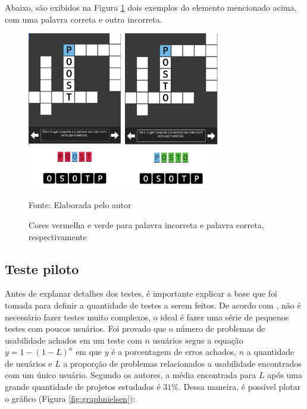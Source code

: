 Abaixo, são exibidos na Figura \ref{fig:verdevermelho} dois exemplos do elemento mencionado acima, com uma palavra correta e outra incorreta.

\begin{figure}[H]
\centering
    \caption{Cores vermelha e verde para palavra incorreta e palavra correta, respectivamente}
    \label{fig:verdevermelho}
    \includegraphics[width=0.75\textwidth]{Figuras/verdevermelho.jpg}
    
    Fonte: Elaborada pelo autor
\end{figure}


\subsection{Teste piloto}
Antes de explanar detalhes dos testes, é importante explicar a base que foi tomada para definir a quantidade de testes a serem feitos. De acordo com \cite{nielsenUsabilityMath}, não é necessário fazer testes muito complexos, o ideal é fazer uma série de pequenos testes com poucos usuários. Foi provado que o número de problemas de usabilidade achados em um teste com $n$ usuários segue a equação $y = 1-(1-L)^n$ em que $y$ é a porcentagem de erros achados, $n$ a quantidade de usuários e $L$ a proporção de problemas relacionados a usabilidade encontrados com um único usuário. Segundo os autores, a média encontrada para $L$ após uma grande quantidade de projetos estudados é $31\%$. Dessa maneira, é possível plotar o gráfico (Figura \ref{fig:graphnielsen}):

